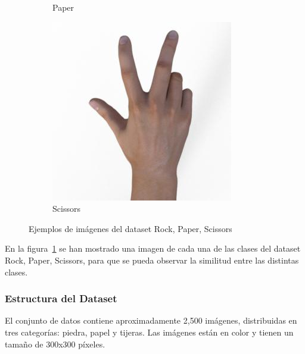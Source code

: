 \begin{figure}[htp]
\begin{subfigure}[t]{0.3\textwidth}
        \caption*{Paper}
    \end{subfigure}
    \begin{subfigure}[t]{0.3\textwidth}
        \centering
        \includegraphics[width=\linewidth]{imagenes/dataset_examples/scissors.jpg}
        \caption*{Scissors}
    \end{subfigure}
    \caption{Ejemplos de imágenes del dataset Rock, Paper, Scissors}
    \label{fig:ejemplos-rps}
\end{figure}

En la figura~\ref{fig:ejemplos-rps} se han mostrado una imagen de cada una de las clases del dataset Rock, Paper, Scissors,
para que se pueda observar la similitud entre las distintas clases.

\subsubsection{Estructura del Dataset}
El conjunto de datos contiene aproximadamente 2,500 imágenes, distribuidas en tres categorías: piedra, papel y tijeras.
Las imágenes están en color y tienen un tamaño de 300x300 píxeles.

